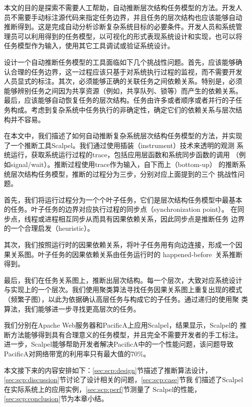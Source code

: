 本文的目的是探索不需要人工帮助，自动推断层次结构任务模型的方法。开发人
员不需要手动标注源代码来指定任务边界，并且任务的层次结构也应该能够自动
推断得到。这是完成自动分析诊断复杂系统目标的必要条件。开发人员和系统管
理员可以利用得到的任务模型，以可视化的形式表现系统设计和实现，也可以将
任务模型作为输入，使用其它工具调试或验证系统设计。

设计一个自动推断任务模型的工具面临如下几个挑战性问题。首先，应该能够确
认合理的任务边界，这一过程应该只基于对系统执行过程的监视，而不需要开发
人员显式的标注。其次，必须能够正确的关联任务之间依赖关系。特别是，必须
能够辨别任务之间因为共享资源（例如，共享队列、锁等）而产生的依赖关系。
最后，应该能够自动恢复任务的层次结构。任务由许多或者顺序或者并行的子任
务构成。考虑到复杂系统中任务执行的非确定性，确定它们的依赖关系与层次结
构并不容易。

在本文中，我们描述了如何自动推断复杂系统层次结构任务模型的方法，并实现
了一个推断工具Scalpel。我们通过使用插装（instrument）技术来透明的观测
系统运行，获取系统运行过程的trace，包括应用层函数和系统同步函数的调用
（例如signal/wait）。推断过程使用trace作为输入，自下而上（bottom-up）
的推断系统层次结构任务模型，推断的过程分为三步，分别对应上面提到的三个
挑战性问题。

首先，我们将运行过程分为一个个叶子任务，它们是层次结构任务模型中最基本
的任务。叶子任务的边界对应执行过程的同步点（synchronization point）。
在同步点，线程或进程相互同步从而具有因果依赖关系，因此同步点是推断任务
边界的一个合理启发（heuristic）。

其次，我们按照运行时的因果依赖关系，将叶子任务用有向边连接，形成一个因
果关系图。叶子任务的因果依赖关系由任务运行时的
happened-before~\cite{lamport_clock}关系推断得到。

最后，我们在任务关系图上，推断出层次结构。每一个层次，大致对应系统设计
与实现上的一个层次。我们使用聚类算法寻找任务因果关系图上重复出现的模式
（频繁子图），以此为依据确认高层任务与构成它的子任务。通过递归的使用聚
类算法，我们能够进一步寻找更高层次的任务。

我们分别在Apache Web服务器和PacificA上应用Scalpel，结果显示，Scalpel的
推断方法能够得到具有合理意义的任务模型，并且完全不需要开发者的手工标注。
进一步，Scalpel能够帮助开发者解决PacificA中的一个性能问题，该问题导致
PacificA对网络带宽的利用率只有最大值的70\%。

本文接下来的内容安排如下：\ref{sec:scp:design}节描述了推断算法设计，
\ref{sec:scp:discussion}节讨论了设计相关的问题，\ref{sec:scp:case}节我
们描述了Scalpel在实际系统上的应用实例，\ref{sec:scp:perf}节测量了
Scalpel的性能，\ref{sec:scp:conclusion}节为本章小结。

